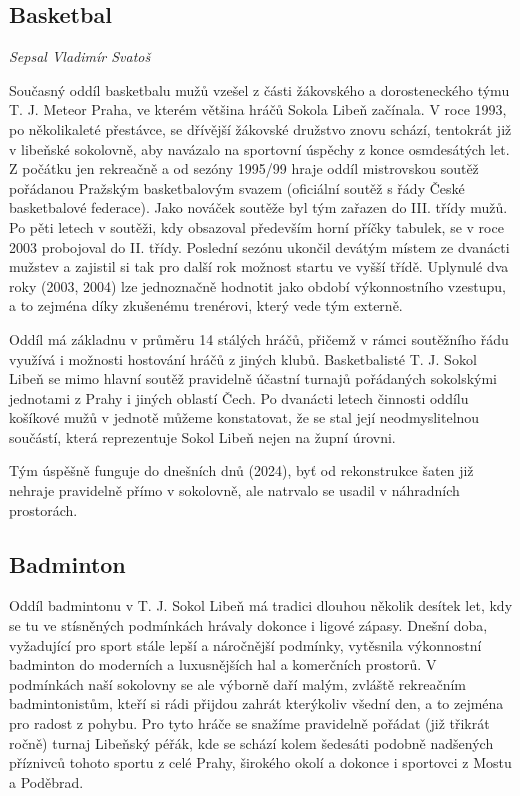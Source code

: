 \subsection{Basketbal}\label{basketbal}

\emph{Sepsal Vladimír Svatoš}

Současný oddíl basketbalu mužů vzešel z části žákovského a
dorosteneckého týmu T. J. Meteor Praha, ve kterém většina hráčů Sokola
Libeň začínala. V roce 1993, po několikaleté přestávce, se dřívější
žákovské družstvo znovu schází, tentokrát již v libeňské sokolovně, aby
navázalo na sportovní úspěchy z konce osmdesátých let. Z počátku jen
rekreačně a od sezóny 1995/99 hraje oddíl mistrovskou soutěž pořádanou
Pražským basketbalovým svazem (oficiální soutěž s řády České
basketbalové federace). Jako nováček soutěže byl tým zařazen do III.
třídy mužů. Po pěti letech v soutěži, kdy obsazoval především horní
příčky tabulek, se v roce 2003 probojoval do II. třídy. Poslední sezónu
ukončil devátým místem ze dvanácti mužstev a zajistil si tak pro další
rok možnost startu ve vyšší třídě. Uplynulé dva roky (2003, 2004) lze
jednoznačně hodnotit jako období výkonnostního vzestupu, a to zejména
díky zkušenému trenérovi, který vede tým externě.

Oddíl má základnu v průměru 14 stálých hráčů, přičemž v rámci soutěžního
řádu využívá i možnosti hostování hráčů z jiných klubů. Basketbalisté T.
J. Sokol Libeň se mimo hlavní soutěž pravidelně účastní turnajů
pořádaných sokolskými jednotami z Prahy i jiných oblastí Čech. Po
dvanácti letech činnosti oddílu košíkové mužů v jednotě můžeme
konstatovat, že se stal její neodmyslitelnou součástí, která
reprezentuje Sokol Libeň nejen na župní úrovni.

Tým úspěšně funguje do dnešních dnů (2024), byť od rekonstrukce šaten
již nehraje pravidelně přímo v sokolovně, ale natrvalo se usadil v
náhradních prostorách.

\subsection{Badminton}\label{badminton}

Oddíl badmintonu v T. J. Sokol Libeň má tradici dlouhou několik desítek
let, kdy se tu ve stísněných podmínkách hrávaly dokonce i ligové zápasy.
Dnešní doba, vyžadující pro sport stále lepší a náročnější podmínky,
vytěsnila výkonnostní badminton do moderních a luxusnějších hal a
komerčních prostorů. V podmínkách naší sokolovny se ale výborně daří
malým, zvláště rekreačním badmintonistům, kteří si rádi přijdou zahrát
kterýkoliv všední den, a to zejména pro radost z pohybu. Pro tyto hráče
se snažíme pravidelně pořádat (již třikrát ročně) turnaj Libeňský péřák,
kde se schází kolem šedesáti podobně nadšených příznivců tohoto sportu z
celé Prahy, širokého okolí a dokonce i sportovci z Mostu a Poděbrad.

